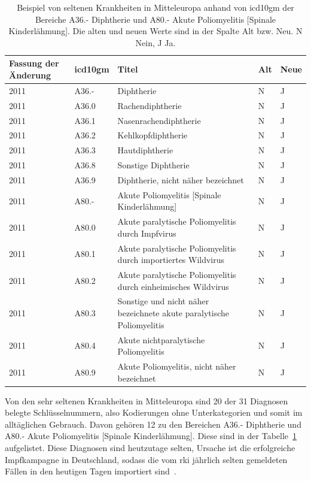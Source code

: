 \begin{table}[ht]
	\centering
	\caption[Beispiel von seltenen Krankheiten in Mitteleuropa (Diphtherie und Poliomyelitis)]{Beispiel von seltenen Krankheiten in Mitteleuropa anhand von \ac{icd10gm} der Bereiche \textsf{A36.-} \textsf{Diphtherie} und \textsf{A80.-} \textsf{Akute Poliomyelitis [Spinale Kinderlähmung]}. Die alten und neuen Werte sind in der Spalte \glqq Alt\grqq{} bzw. \glqq Neu\grqq{}. \glqq\textsf{N}\grqq{} Nein, \glqq\textsf{J}\grqq{}\grqq{} Ja.}
	\label{tab:icdeuropa}
	\begin{tabular}{|p{1.6cm}|l|p{7cm}|l|l|}
		\hline
		\rowcolor{lightgray} Fassung der Änderung & \ac{icd10gm} & Titel & Alt & Neue \\ \hline
		\rowcolor{maroon!10} 2011 & A36.- & Diphtherie & N & J \\ \hline
		2011 & A36.0 & Rachendiphtherie & N & J \\ \hline
		2011 & A36.1 & Nasenrachendiphtherie & N & J \\ \hline
		2011 & A36.2 & Kehlkopfdiphtherie & N & J \\ \hline
		2011 & A36.3 & Hautdiphtherie & N & J \\ \hline
		2011 & A36.8 & Sonstige Diphtherie & N & J \\ \hline
		2011 & A36.9 & Diphtherie, nicht näher bezeichnet & N & J \\ \hline \hline
		\rowcolor{maroon!10} 2011 & A80.- & Akute Poliomyelitis [Spinale Kinderlähmung] & N & J \\ \hline
		2011 & A80.0 & Akute paralytische Poliomyelitis durch Impfvirus & N & J \\ \hline
		2011 & A80.1 & Akute paralytische Poliomyelitis durch importiertes Wildvirus & N & J \\ \hline
		2011 & A80.2 & Akute paralytische Poliomyelitis durch einheimisches Wildvirus & N & J \\ \hline
		2011 & A80.3 & Sonstige und nicht näher bezeichnete akute paralytische Poliomyelitis & N & J \\ \hline
		2011 & A80.4 & Akute nichtparalytische Poliomyelitis & N & J \\ \hline
		2011 & A80.9 & Akute Poliomyelitis, nicht näher bezeichnet & N & J \\ \hline
	\end{tabular}
\end{table}

Von den sehr seltenen Krankheiten in Mitteleuropa sind 20 der 31 Diagnosen belegte Schlüsselnummern, also Kodierungen ohne Unterkategorien und somit im alltäglichen  Gebrauch. Davon gehören 12 zu den Bereichen \textsf{A36.-} \textsf{Diphtherie} und \textsf{A80.-} \textsf{Akute Poliomyelitis [Spinale Kinderlähmung]}. Diese sind in der Tabelle~\ref{tab:icdeuropa} aufgelistet. Diese Diagnosen sind heutzutage selten, Ursache ist die erfolgreiche Impfkampagne in Deutschland, sodass die vom \ac{rki} jährlich selten gemeldeten Fällen in den heutigen Tagen importiert sind~\cite{dippol1}.

